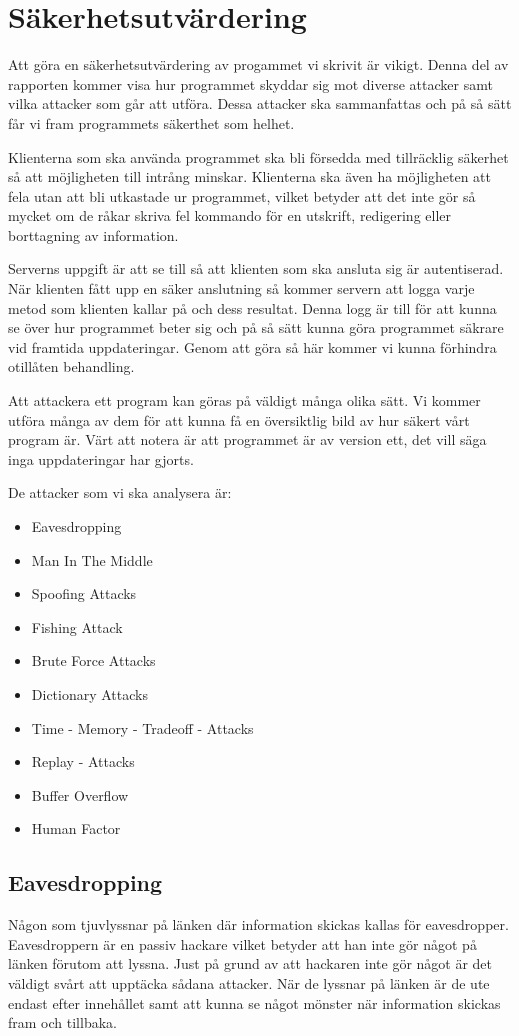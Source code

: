 \section{Säkerhetsutvärdering}
Att göra en säkerhetsutvärdering av progammet vi skrivit är vikigt. Denna del av rapporten kommer visa hur programmet skyddar sig mot diverse attacker samt vilka attacker som går att utföra. Dessa attacker ska sammanfattas och på så sätt får vi fram programmets säkerthet som helhet. 

Klienterna som ska använda programmet ska bli försedda med tillräcklig säkerhet så att möjligheten till intrång minskar. Klienterna ska även ha möjligheten att fela utan att bli utkastade ur programmet, vilket betyder att det inte gör så mycket om de råkar skriva fel kommando för en utskrift, redigering eller borttagning av information.

Serverns uppgift är att se till så att klienten som ska ansluta sig är autentiserad. När klienten fått upp en säker anslutning så kommer servern att logga varje metod som klienten kallar på och dess resultat. Denna logg är till för att kunna se över hur programmet beter sig och på så sätt kunna göra programmet säkrare vid framtida uppdateringar. Genom att göra så här kommer vi kunna förhindra otillåten behandling.

Att attackera ett program kan göras på väldigt många olika sätt. Vi kommer utföra många av dem för att kunna få en översiktlig bild av hur säkert vårt program är. Värt att notera är att programmet är av version ett, det vill säga inga uppdateringar har gjorts. 

De attacker som vi ska analysera är:

\begin{itemize}
\item{Eavesdropping}
\item{Man In The Middle}
\item{Spoofing Attacks}
\item{Fishing Attack}
\item{Brute Force Attacks}
\item{Dictionary Attacks}
\item{Time - Memory - Tradeoff - Attacks}
\item{Replay - Attacks}
\item{Buffer Overflow}
\item{Human Factor}
\end{itemize}

\subsection{Eavesdropping}
Någon som tjuvlyssnar på länken där information skickas kallas för eavesdropper. Eavesdroppern är en passiv hackare vilket betyder att han inte gör något på länken förutom att lyssna. Just på grund av att hackaren inte gör något är det väldigt svårt att upptäcka sådana attacker. När de lyssnar på länken är de ute endast efter innehållet samt att kunna se något mönster när information skickas fram och tillbaka.

